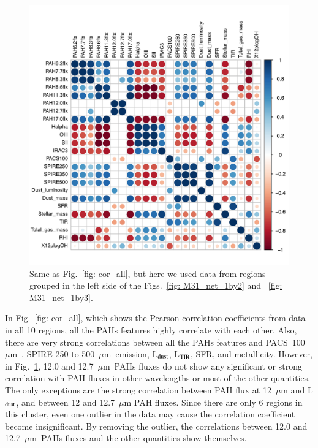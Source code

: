         \begin{figure}
        \centering
        \includegraphics[width=\textwidth]{../image_paper3/images0.01/cor_plots/M31_derived_3_to_8_core_plot_for_paper.pdf}%
        \caption{Same as Fig.~\ref{fig: cor_all}, but here we used data from regions grouped in the left side of the Figs.~\ref{fig: M31_net_1by2} and ~\ref{fig: M31_net_1by3}. }
          \label{fig: cor_cluster1}
        \end{figure}
        
        In Fig.~\ref{fig: cor_all}, which shows the Pearson correlation coefficients from data in all 10 regions, all the PAHs features highly correlate with each other. 
        Also, there are very strong correlations between all the PAHs features and PACS~100~$\mu$m~, SPIRE 250 to 500~$\mu$m~emission, L$_{\rm dust}$, L$_{\rm TIR}$, SFR, and metallicity.
        However, in Fig.~\ref{fig: cor_cluster1}, 12.0 and 12.7~$\mu$m~PAHs fluxes do not show any significant or strong correlation with PAH fluxes in other wavelengths or most of the other quantities.
        The only exceptions are the strong correlation between PAH flux at 12~$\mu$m and L$_{\rm dust}$, and between 12 and 12.7~$\mu$m PAH fluxes.
        Since there are only 6 regions in this cluster, even one outlier in the data may cause the correlation coefficient become insignificant.
        By removing the outlier, the correlations between 12.0 and 12.7~$\mu$m~PAHs fluxes and the other quantities show themselves. 
        

